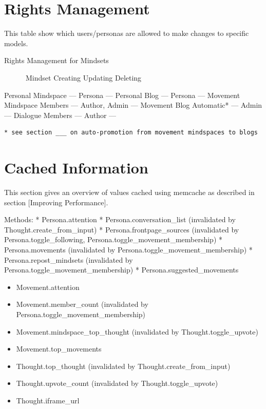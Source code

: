 \section{Rights Management}\label{rights-management}

This table show which users/personas are allowed to make changes to
specific models.

Rights Management for Mindsets

~~~~~~Mindset \textbar{} Creating \textbar{} Updating \textbar{}
Deleting

Personal Mindspace --- Persona --- Personal Blog --- Persona ---
Movement Mindspace Members --- Author, Admin --- Movement Blog
Automatic* --- Admin --- Dialogue Members --- Author ---

\begin{verbatim}
* see section ___ on auto-promotion from movement mindspaces to blogs
\end{verbatim}

\section{Cached Information}\label{cached-information}

This section gives an overview of values cached using memcache as
described in section {[}Improving Performance{]}.

Methods: * Persona.attention * Persona.conversation\_list (invalidated
by Thought.create\_from\_input) * Persona.frontpage\_sources
(invalidated by Persona.toggle\_following,
Persona.toggle\_movement\_membership) * Persona.movements (invalidated
by Persona.toggle\_movement\_membership) * Persona.repost\_mindsets
(invalidated by Persona.toggle\_movement\_membership) *
Persona.suggested\_movements

\begin{itemize}
\item
  Movement.attention
\item
  Movement.member\_count (invalidated by
  Persona.toggle\_movement\_membership)
\item
  Movement.mindspace\_top\_thought (invalidated by
  Thought.toggle\_upvote)
\item
  Movement.top\_movements
\item
  Thought.top\_thought (invalidated by Thought.create\_from\_input)
\item
  Thought.upvote\_count (invalidated by Thought.toggle\_upvote)
\item
  Thought.iframe\_url
\end{itemize}


